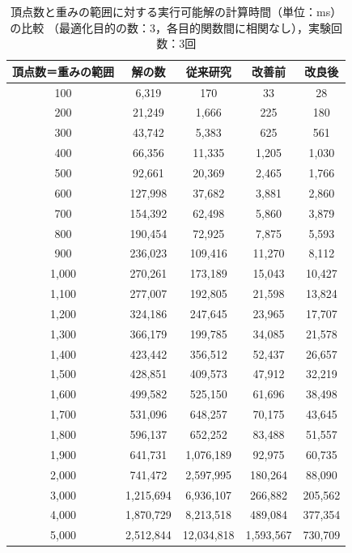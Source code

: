 \documentclass[12pt]{optlab-bachelor}
\begin{document}
\begin{table}[h]
  \centering
  \caption{頂点数と重みの範囲に対する実行可能解の計算時間（単位：ms）の比較
  （最適化目的の数：3，各目的関数間に相関なし），実験回数：3回}
  {\small
  \begin{tabular}{|c|c|c|c|c|} \hline
    頂点数＝重みの範囲 & 解の数 & 従来研究 & 改善前 & 改良後 \\ \hline
    100 &	6,319	& 170 &	33 &	28 \\ \hline
    200 &	21,249 &	1,666 &	225 &	180 \\ \hline
    300 &	43,742 &	5,383 &	625 &	561 \\ \hline
    400 &	66,356 &	11,335 &	1,205 &	1,030 \\ \hline
    500 &	92,661 &	20,369 &	2,465 &	1,766 \\ \hline
    600 &	127,998 &	37,682 &	3,881 &	2,860 \\ \hline
    700 &	154,392 &	62,498 &	5,860 &	3,879 \\ \hline
    800 &	190,454 &	72,925 &	7,875 &	5,593 \\ \hline
    900 &	236,023 &	109,416 &	11,270 &	8,112 \\ \hline
    1,000 &	270,261 &	173,189 &	15,043 &	10,427 \\ \hline
    1,100 &	277,007 &	192,805 &	21,598 &	13,824 \\ \hline
    1,200 &	324,186 &	247,645 &	23,965 &	17,707 \\ \hline
    1,300 &	366,179 &	199,785 &	34,085 &	21,578 \\ \hline
    1,400 &	423,442 &	356,512 &	52,437 &	26,657 \\ \hline
    1,500 &	428,851 &	409,573 &	47,912 &	32,219 \\ \hline
    1,600 &	499,582 &	525,150 &	61,696 &	38,498 \\ \hline
    1,700 &	531,096 &	648,257 &	70,175 &	43,645 \\ \hline
    1,800 &	596,137 &	652,252 &	83,488 &	51,557 \\ \hline
    1,900 &	641,731 &	1,076,189 &	92,975 &	60,735 \\ \hline
    2,000 &	741,472 &	2,597,995 &	180,264 &	88,090 \\ \hline
    3,000 &	1,215,694 &	6,936,107 &	266,882 &	205,562 \\ \hline
    4,000 &	1,870,729 &	8,213,518 &	489,084 &	377,354 \\ \hline
    5,000 &	2,512,844 &	12,034,818 &	1,593,567 &	730,709 \\ \hline

\end{tabular}}
\end{table}
\end{document}
